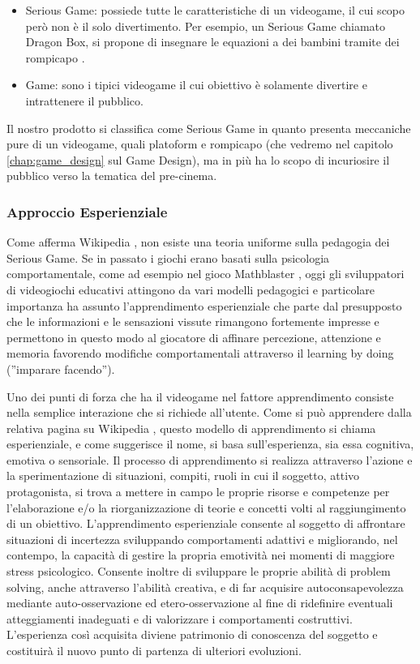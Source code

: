 \begin{itemize}
\item Serious Game: possiede tutte le caratteristiche di un videogame, il cui scopo però non è il solo divertimento. Per esempio, un Serious Game chiamato Dragon Box, si propone di insegnare le equazioni a dei bambini tramite dei rompicapo \cite{dragonboxhome}.


\item Game: sono i tipici videogame il cui obiettivo è solamente divertire e intrattenere il pubblico.
\end{itemize}

Il nostro prodotto si classifica come Serious Game in quanto presenta meccaniche pure di un videogame, quali platoform e rompicapo (che vedremo nel capitolo \ref{chap:game_design} sul Game Design), ma in più ha lo scopo di incuriosire il pubblico verso la tematica del pre-cinema.

\newpage

\subsubsection{Approccio Esperienziale}
\label{sec:seriousgameesp}

Come afferma Wikipedia \cite{wikiseriousgames}, non esiste una teoria uniforme sulla pedagogia dei Serious Game. Se in passato i giochi erano basati sulla psicologia comportamentale, come ad esempio nel gioco Mathblaster  \cite{mathblaster}, 
oggi gli sviluppatori di videogiochi educativi attingono da vari modelli pedagogici e particolare importanza ha assunto l'apprendimento esperienziale che parte dal presupposto che le informazioni 
e le sensazioni vissute rimangono fortemente impresse e permettono in questo modo al giocatore di affinare percezione, attenzione e memoria favorendo modifiche comportamentali attraverso il learning by doing (''imparare facendo'').

Uno dei punti di forza che ha il videogame nel fattore apprendimento consiste nella semplice interazione che si richiede all'utente. Come si può apprendere dalla relativa pagina su Wikipedia \cite{apprendimentoesperienziale}, questo modello di apprendimento si chiama esperienziale, e come suggerisce il nome, si basa sull'esperienza, sia essa cognitiva, emotiva o sensoriale. Il processo di apprendimento si realizza attraverso l'azione e la sperimentazione di situazioni, compiti, ruoli in cui il soggetto, attivo protagonista, si trova a mettere in campo le proprie risorse e competenze per l'elaborazione e/o la riorganizzazione di teorie e concetti volti al raggiungimento di un obiettivo. L'apprendimento esperienziale consente al soggetto di affrontare situazioni di incertezza sviluppando comportamenti adattivi e migliorando, nel contempo, la capacità di gestire la propria emotività nei momenti di maggiore stress psicologico. Consente inoltre di sviluppare le proprie abilità di problem solving, anche attraverso l'abilità creativa, e di far acquisire autoconsapevolezza mediante auto-osservazione ed etero-osservazione al fine di ridefinire eventuali atteggiamenti inadeguati e di valorizzare i comportamenti costruttivi. L'esperienza così acquisita diviene patrimonio di conoscenza del soggetto e costituirà il nuovo punto di partenza di ulteriori evoluzioni.

